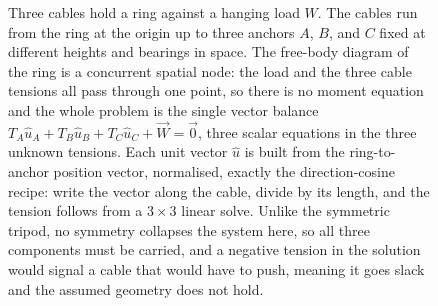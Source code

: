 \begin{figure}[htbp]
\centering
{}
\caption[A spatial three-cable anchor point]{Three cables hold a ring against a
hanging load $W$. The cables run from the ring at the origin up to three
anchors $A$, $B$, and $C$ fixed at different heights and bearings in space. The
free-body diagram of the ring is a concurrent spatial node: the load and the
three cable tensions all pass through one point, so there is no moment equation
and the whole problem is the single vector balance $T_A\hat{u}_A + T_B\hat{u}_B
+ T_C\hat{u}_C + \vec{W} = \vec{0}$, three scalar equations in the three unknown
tensions. Each unit vector $\hat{u}$ is built from the ring-to-anchor position
vector, normalised, exactly the direction-cosine recipe: write the vector along
the cable, divide by its length, and the tension follows from a $3\times 3$
linear solve. Unlike the symmetric tripod, no symmetry collapses the system
here, so all three components must be carried, and a negative tension in the
solution would signal a cable that would have to push, meaning it goes slack and
the assumed geometry does not hold.}
\label{fig:vol03ch01:spatial-anchor}
\end{figure}
